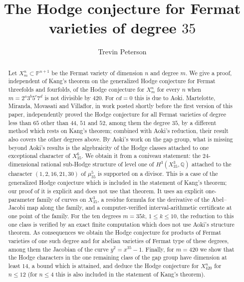\documentclass[11pt]{amsart}
\title[Hodge conjecture for Fermat varieties of degree $35$]{The Hodge conjecture for Fermat varieties of degree $35$}
\author{Trevin Peterson}
\date{}
\theoremstyle{definition}
\theoremstyle{remark}
\numberwithin{equation}{section}
\newcommand{\Q}{\mathbb{Q}}
\newcommand{\PP}{\mathbb{P}}
\begin{document}
\begin{abstract}
Let $X^n_m\subset\PP^{n+1}$ be the Fermat variety of dimension $n$ and degree $m$. We give a proof, independent of Kang's theorem on the generalized Hodge conjecture for Fermat threefolds and fourfolds, of the Hodge conjecture for $X^n_m$ for every $n$ when $m=2^a3^b5^c7^d$ is not divisible by $420$. For $cd=0$ this is due to Aoki. Martelotte, Miranda, Movasati and Villaflor, in work posted shortly before the first version of this paper, independently proved the Hodge conjecture for all Fermat varieties of degree less than $65$ other than $44$, $51$ and $52$, among them the degree $35$, by a different method which rests on Kang's theorem; combined with Aoki's reduction, their result also covers the other degrees above. By Aoki's work on the gap group, what is missing beyond Aoki's results is the algebraicity of the Hodge classes attached to one exceptional character of $X^6_{35}$. We obtain it from a coniveau statement: the $24$-dimensional rational sub-Hodge structure of level one of $H^3(X^3_{35},\Q)$ attached to the character $(1,2,16,21,30)$ of $\mu_{35}^5$ is supported on a divisor. This is a case of the generalized Hodge conjecture which is included in the statement of Kang's theorem; our proof of it is explicit and does not use that theorem. It uses an explicit one-parameter family of curves on $X^3_{35}$, a residue formula for the derivative of the Abel--Jacobi map along the family, and a computer-verified interval-arithmetic certificate at one point of the family. For the ten degrees $m=35k$, $1\le k\le 10$, the reduction to this one class is verified by an exact finite computation which does not use Aoki's structure theorem. As consequences we obtain the Hodge conjecture for products of Fermat varieties of one such degree and for abelian varieties of Fermat type of these degrees, among them the Jacobian of the curve $y^2=x^{35}-1$. Finally, for $m=420$ we show that the Hodge characters in the one remaining class of the gap group have dimension at least $14$, a bound which is attained, and deduce the Hodge conjecture for $X^n_{420}$ for $n\le12$ (for $n\le4$ this is also included in the statement of Kang's theorem).
\end{abstract}

\maketitle

\end{document}
